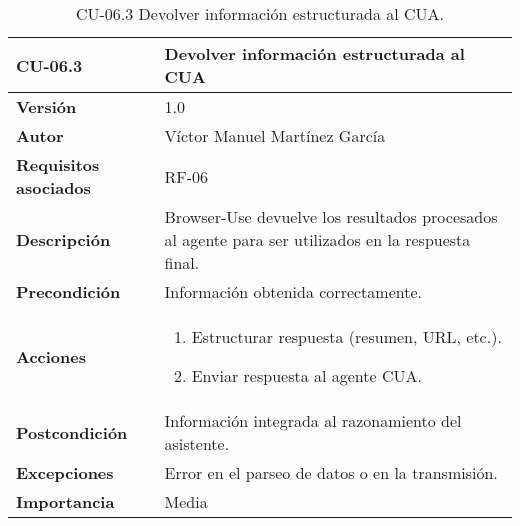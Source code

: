 \begin{table}[p]
    \centering
    \begin{tabularx}{\linewidth}{ p{} p{} }
        \toprule
        \textbf{CU-06.3}    & \textbf{Devolver información estructurada al CUA}\\
        \toprule
        \textbf{Versión}              & 1.0 \\
        \textbf{Autor}                & Víctor Manuel Martínez García \\
        \textbf{Requisitos asociados} & RF-06 \\
        \textbf{Descripción}          & Browser-Use devuelve los resultados procesados al agente para ser utilizados en la respuesta final.\\
        \textbf{Precondición}         & Información obtenida correctamente.\\
        \textbf{Acciones}             &
        \begin{enumerate}
          \item Estructurar respuesta (resumen, URL, etc.).
          \item Enviar respuesta al agente CUA.
        \end{enumerate}\\
        \textbf{Postcondición}        & Información integrada al razonamiento del asistente.\\
        \textbf{Excepciones}          & Error en el parseo de datos o en la transmisión.\\
        \textbf{Importancia}          & Media \\
        \bottomrule
    \end{tabularx}
    \caption{CU-06.3 Devolver información estructurada al CUA.}
    \label{CU-06.3 Devolver información estructurada al CUA}
\end{table}

